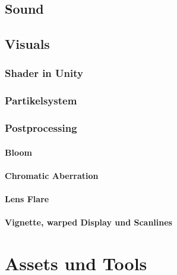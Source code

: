 \documentclass[a4paper,10pt,ngerman,fontsize=12pt]{scrreprt}
\begin{document}
\section{Sound}

\lipsum[3]



\section{Visuals}
\lipsum[3]



\subsection{Shader in Unity}
\lipsum[3]


\subsection{Partikelsystem}
\lipsum[3]


\subsection{Postprocessing}
\lipsum[3]


\subsubsection{Bloom}
\lipsum[3]


\subsubsection{Chromatic Aberration}
\lipsum[3]


\subsubsection{Lens Flare}
\lipsum[3]


\subsubsection{Vignette, warped Display und Scanlines}
\lipsum[3]



\chapter{Assets und Tools}
\lipsum[3]
\end{document}
